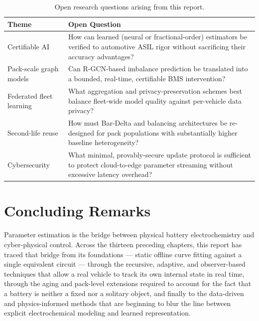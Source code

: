 \begin{table}[htbp]
\centering
\caption{Open research questions arising from this report.}
\label{tab:14_open_questions}
\renewcommand{\arraystretch}{1.4}
\begin{tabularx}{\textwidth}{@{}l X@{}}
\toprule
\textbf{Theme} & \textbf{Open Question} \\
\midrule
Certifiable AI & How can learned (neural or fractional-order) estimators be verified to automotive ASIL rigor without sacrificing their accuracy advantages? \\
Pack-scale graph models & Can R-GCN-based imbalance prediction be translated into a bounded, real-time, certifiable BMS intervention? \\
Federated fleet learning & What aggregation and privacy-preservation schemes best balance fleet-wide model quality against per-vehicle data privacy? \\
Second-life reuse & How must Bar-Delta and balancing architectures be re-designed for pack populations with substantially higher baseline heterogeneity? \\
Cybersecurity & What minimal, provably-secure update protocol is sufficient to protect cloud-to-edge parameter streaming without excessive latency overhead? \\
\bottomrule
\end{tabularx}
\end{table}

\section{Concluding Remarks}
\label{sec:14_summary_conclusion}

Parameter estimation is the bridge between physical battery electrochemistry and cyber-physical control. Across the thirteen preceding chapters, this report has traced that bridge from its foundations — static offline curve fitting against a single equivalent circuit — through the recursive, adaptive, and observer-based techniques that allow a real vehicle to track its own internal state in real time, through the aging and pack-level extensions required to account for the fact that a battery is neither a fixed nor a solitary object, and finally to the data-driven and physics-informed methods that are beginning to blur the line between explicit electrochemical modeling and learned representation.

